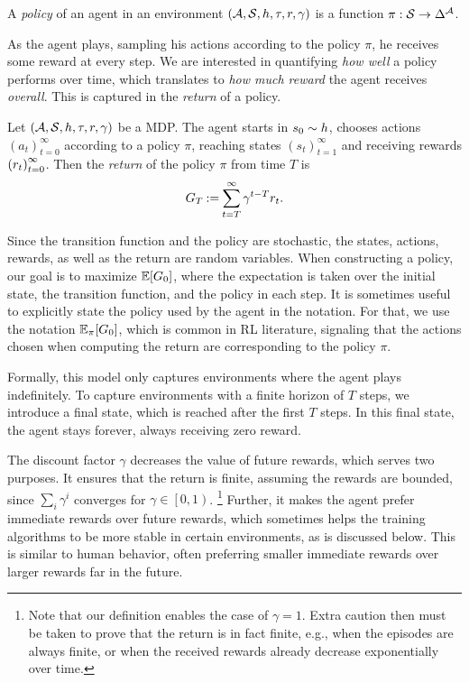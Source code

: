 \begin{defi}[Policy]
	\label{def:policy}
	A \emph{policy} of an agent in an environment $ \left( \mathcal{A}, \mathcal{S}, h, \tau, r, \gamma \right) $ is a function $ \pi: \mathcal{S} \to \Delta^{\mathcal{A}} $.
\end{defi}

As the agent plays, sampling his actions according to the policy $ \pi $, he receives some reward at every step.
We are interested in quantifying \emph{how well} a policy performs over time, which translates to \emph{how much reward} the agent receives \emph{overall}.
This is captured in the \emph{return} of a policy.

\begin{defi}[Return]
	Let $ \left( \mathcal{A}, \mathcal{S}, h, \tau, r, \gamma \right) $ be a MDP.
	The agent starts in $ s_0 \sim h $, chooses actions $ \left( a_t \right)_{t=0}^\infty $ according to a policy $ \pi $, reaching states $ \left( s_t \right)_{t=1}^\infty $ and receiving rewards $ \left( r_t \right)_{t=0}^\infty $.
	Then the \emph{return} of the policy $ \pi $ from time $ T $ is \[
		G_T \mathbin{:=} \sum_{t=T}^{\infty} \gamma^{t-T} r_t.
	\]
\end{defi}

Since the transition function and the policy are stochastic, the states, actions, rewards, as well as the return are random variables.
When constructing a policy, our goal is to maximize $ \operatorname*{\mathbb{E}}\!\left[ G_0 \right] $, where the expectation is taken over the initial state, the transition function, and the policy in each step.
It is sometimes useful to explicitly state the policy used by the agent in the notation.
For that, we use the notation $ \operatorname*{\mathbb{E}}_\pi\!\left[ G_0 \right] $, which is common in RL literature, signaling that the actions chosen when computing the return are corresponding to the policy $ \pi $.

Formally, this model only captures environments where the agent plays indefinitely.
To capture environments with a finite horizon of $ T $ steps, we introduce a final state, which is reached after the first $ T $ steps.
In this final state, the agent stays forever, always receiving zero reward.

The discount factor $ \gamma $ decreases the value of future rewards, which serves two purposes.
It ensures that the return is finite, assuming the rewards are bounded, since $ \sum_i \gamma^i $ converges for $ \gamma \in \left[ 0,1 \right) $.%
\footnote{Note that our definition enables the case of $ \gamma = 1 $. Extra caution then must be taken to prove that the return is in fact finite, e.g., when the episodes are always finite, or when the received rewards already decrease exponentially over time.}
Further, it makes the agent prefer immediate rewards over future rewards, which sometimes helps the training algorithms to be more stable in certain environments, as is discussed below.
This is similar to human behavior, often preferring smaller immediate rewards over larger rewards far in the future.

